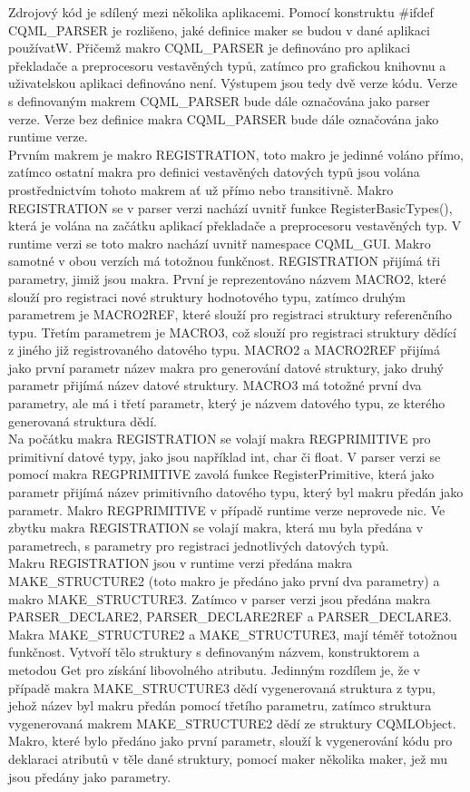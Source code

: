 \documentclass[report,11pt]{elsarticle}
\begin{document}
Zdrojový kód je sdílený mezi několika aplikacemi. Pomocí konstruktu \#ifdef CQML\_PARSER je rozlišeno, jaké definice maker se budou v dané aplikaci používatW. Přičemž makro CQML\_PARSER je definováno pro aplikaci překladače a preprocesoru vestavěných typů, zatímco pro grafickou knihovnu a uživatelskou aplikaci definováno není. Výstupem jsou tedy dvě verze kódu. Verze s definovaným makrem CQML\_PARSER bude dále označována jako parser verze. Verze bez definice makra CQML\_PARSER bude dále označována jako runtime verze.\\

Prvním makrem je makro REGISTRATION, toto makro je jedinné voláno přímo, zatímco ostatní makra pro definici vestavěných datových typů jsou volána prostřednictvím tohoto makrem ať už přímo nebo transitivně. Makro REGISTRATION se v parser verzi nachází uvnitř funkce RegisterBasicTypes(), která je volána na začátku aplikací překladače a preprocesoru vestavěných typ. V runtime verzi se toto makro nachází uvnitř namespace CQML\_GUI. Makro samotné v obou verzích má totožnou funkčnost. REGISTRATION přijímá tři parametry, jimiž jsou makra. První je reprezentováno názvem MACRO2, které slouží pro registraci nové struktury hodnotového typu, zatímco druhým parametrem je MACRO2REF, které slouží pro registraci struktury referenčního typu. Třetím parametrem je MACRO3, což slouží pro registraci struktury dědící z jiného již registrovaného datového typu. MACRO2 a MACRO2REF přijímá jako první parametr název makra pro generování datové struktury, jako druhý parametr přijímá název datové struktury. MACRO3 má totožné první dva parametry, ale má i třetí parametr, který je názvem datového typu, ze kterého generovaná struktura dědí. \\
Na počátku makra REGISTRATION se volají makra REGPRIMITIVE pro primitivní datové typy, jako jsou například int, char či float. V parser verzi se pomocí makra REGPRIMITIVE zavolá funkce RegisterPrimitive, která jako parametr přijímá název primitivního datového typu, který byl makru předán jako parametr. Makro REGPRIMITIVE v případě runtime verze neprovede nic. Ve zbytku makra REGISTRATION se volají makra, která mu byla předána v parametrech, s parametry pro registraci jednotlivých datových typů.\\
Makru REGISTRATION jsou v runtime verzi předána makra MAKE\_STRUCTURE2 (toto makro je předáno jako první dva parametry) a makro MAKE\_STRUCTURE3. Zatímco v parser verzi jsou předána makra PARSER\_DECLARE2, PARSER\_DECLARE2REF a PARSER\_DECLARE3.\\
Makra MAKE\_STRUCTURE2 a MAKE\_STRUCTURE3, mají téměř totožnou funkčnost. Vytvoří tělo struktury s definovaným názvem, konstruktorem a metodou Get pro získání libovolného atributu. Jedinným rozdílem je, že v případě makra MAKE\_STRUCTURE3 dědí vygenerovaná struktura z typu, jehož název byl makru předán pomocí třetího parametru, zatímco struktura vygenerovaná makrem MAKE\_STRUCTURE2 dědí ze struktury CQMLObject. Makro, které bylo předáno jako první parametr, slouží k vygenerování kódu pro deklaraci atributů v těle dané struktury, pomocí maker několika maker, jež mu jsou předány jako parametry.\\
\end{document}
